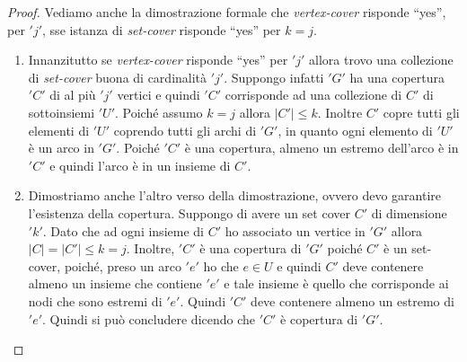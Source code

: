 							\begin{proof}
								Vediamo anche la dimostrazione formale che \textit{vertex-cover} risponde
								``yes'', per $ 'j' $, sse istanza di \textit{set-cover} risponde ``yes'' per
								$k=j$.\\
								\begin{enumerate}
									\item   Innanzitutto se \textit{vertex-cover} risponde ``yes'' per $ 'j' $ allora trovo
									      una collezione di \textit{set-cover} buona di cardinalità $ 'j' $. Suppongo
									      infatti $ 'G' $ ha una copertura $'C'$ di al più $ 'j' $ vertici e quindi $ 'C' $ corrisponde
									      ad una collezione di $C'$ di sottoinsiemi $ 'U' $. Poiché assumo $k=j$ allora
									      $|C'|\leq k$. Inoltre $C'$ copre tutti gli elementi di $ 'U' $ coprendo tutti gli
									      archi di $ 'G' $, in quanto ogni elemento di $ 'U' $ è un arco in $ 'G' $. Poiché $ 'C' $ è
									      una copertura, almeno un estremo dell’arco è in $ 'C' $  e quindi l’arco è in un
									      insieme di $C'$.\\
									\item  Dimostriamo anche l'altro verso della dimostrazione, ovvero devo garantire
									      l'esistenza della copertura. Suppongo di avere un set cover $C'$ di dimensione
									      $ 'k' $. Dato che ad ogni insieme di $C'$ ho associato un vertice in $ 'G' $ allora
									      $|C|=|C'|\leq k=j$. Inoltre, $ 'C' $ è una copertura di $ 'G' $ poiché $C'$ è un
									      set-cover, poiché, preso un arco $ 'e' $ ho che $e\in U$ e quindi $C'$ deve
									      contenere almeno un insieme che contiene $ 'e' $ e tale insieme è quello che
									      corrisponde ai nodi che sono estremi di $ 'e' $. Quindi $ 'C' $ deve contenere almeno
									      un estremo di $ 'e' $. Quindi si può concludere dicendo che $ 'C' $ è copertura di $ 'G' $.
								\end{enumerate}
							\end{proof}
